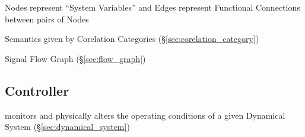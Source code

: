 Nodes represent ``System Variables'' and Edges represent Functional
Connections between pairs of Nodes


Semantics given by Corelation Categories
(\S\ref{sec:corelation_category})

Signal Flow Graph (\S\ref{sec:flow_graph})



\subsection{Controller}\label{sec:controller}


monitors and physically alters the operating conditions of a given
Dynamical System (\S\ref{sec:dynamical_system})
